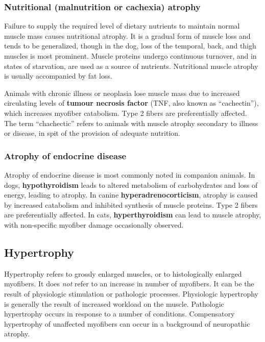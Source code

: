 \documentclass[openany]{report}
\begin{document}
\subsubsection{Nutritional (malnutrition or cachexia)
atrophy}\label{nutritional-malnutrition-or-cachexia-atrophy}

Failure to supply the required level of dietary nutrients to maintain
normal muscle mass causes nutritional atrophy. It is a gradual form of
muscle loss and tends to be generalized, though in the dog, loss of the
temporal, back, and thigh muscles is most prominent. Muscle proteins
undergo continuous turnover, and in states of starvation, are used as a
source of nutrients. Nutritional muscle atrophy is usually accompanied
by fat loss.

Animals with chronic illness or neoplasia lose muscle mass due to
increased circulating levels of \textbf{tumour necrosis factor} (TNF,
also known as ``cachectin''), which increases myofiber catabolism. Type
2 fibers are preferentially affected. The term ``chachectic'' refers to
animals with muscle atrophy secondary to illness or disease, in spit of
the provision of adequate nutrition.

\subsubsection{Atrophy of endocrine
disease}\label{atrophy-of-endocrine-disease}

Atrophy of endocrine disease is most commonly noted in companion
animals. In dogs, \textbf{hypothyroidism} leads to altered metabolism of
carbohydrates and loss of energy, leading to atrophy. In canine
\textbf{hyperadrenocorticism}, atrophy is caused by increased catabolism
and inhibited synthesis of muscle proteins. Type 2 fibers are
preferentially affected. In cats, \textbf{hyperthyroidism} can lead to
muscle atrophy, with non-specific myofiber damage occasionally observed.

\subsection{Hypertrophy}\label{hypertrophy}

Hypertrophy refers to grossly enlarged muscles, or to histologically
enlarged myofibers. It does \emph{not} refer to an increase in number of
myofibers. It can be the result of physiologic stimulation or pathologic
processes. Physiologic hypertrophy is generally the result of increased
workload on the muscle. Pathologic hypertrophy occurs in response to a
number of conditions. Compensatory hypertrophy of unaffected myofibers
can occur in a background of neuropathic atrophy.
\end{document}
